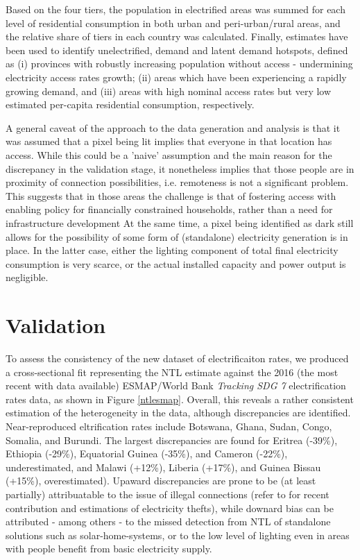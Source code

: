 \documentclass[preprint,12pt]{elsarticle}
\begin{document}
Based on the four tiers, the population in electrified areas was summed for each level of residential consumption in both urban and peri-urban/rural areas, and the relative share of tiers in each country was calculated. Finally, estimates have been used to identify unelectrified, demand and latent demand hotspots, defined as (i) provinces with robustly increasing population without access - undermining electricity access rates growth; (ii) areas which have been experiencing a rapidly growing demand, and (iii) areas with high nominal access rates but very low estimated per-capita residential consumption, respectively. 

A general caveat of the approach to the data generation and analysis is that it was assumed that a pixel being lit implies that everyone in that location has access. While this could be a 'naive' assumption and the main reason for the discrepancy in the validation stage, it nonetheless implies that those people are in proximity of connection possibilities, i.e. remoteness is not a significant problem. This suggests that in those areas the challenge is that of fostering access with enabling policy for financially constrained households, rather than a need for infrastructure development  At the same time, a pixel being identified as dark still allows for the possibility of some form of (standalone) electricity generation is in place. In the latter case, either the lighting component of total final electricity consumption is very scarce, or the actual installed capacity and power output is negligible.

\section{Validation}
To assess the consistency of the new dataset of electrificaiton rates, we produced a cross-sectional fit representing the NTL estimate against the 2016 (the most recent with data available) ESMAP/World Bank \textit{Tracking SDG 7} electrification rates data, as shown in Figure \ref{ntlesmap}. Overall, this reveals a rather consistent estimation of the heterogeneity in the data, although discrepancies are identified. Near-reproduced eltrification rates include Botswana, Ghana, Sudan, Congo, Somalia, and Burundi. The largest discrepancies are found for Eritrea (-39\%), Ethiopia (-29\%), Equatorial Guinea (-35\%), and Cameron (-22\%), underestimated, and Malawi (+12\%), Liberia (+17\%), and Guinea Bissau (+15\%), overestimated). Upaward discrepancies are prone to be (at least partially) attribuatable to the issue of illegal connections (refer to \citep{de2018kenya, yakubu2018electricity} for recent contribution and estimations of electricity thefts), while downard bias can be attributed - among others - to the missed detection from NTL of standalone solutions such as solar-home-systems, or to the low level of lighting even in areas with people benefit from basic electricity supply. 
\end{document}
